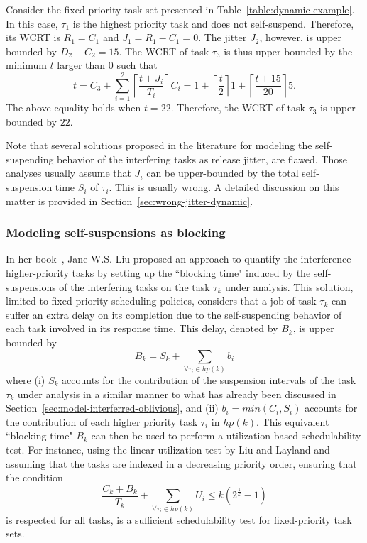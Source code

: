 \begin{example}
\label{ex:suspension-jitter}    
Consider the fixed priority task set presented in Table~\ref{table:dynamic-example}. In this case, $\tau_1$ is the highest priority task and does not self-suspend. Therefore, its WCRT is $R_1 = C_1$ and $J_1 = R_1 - C_1 = 0$. The jitter $J_2$, however, is upper bounded by $D_2 - C_2 =15$. The WCRT of task $\tau_3$ is thus upper bounded by the minimum $t$ larger than $0$ such that 
$$t=C_3+ \sum_{i=1}^2\left\lceil \frac{t + J_i}{T_i} \right\rceil C_i = 1+\left\lceil \frac{t}{2} \right\rceil 1 +\left\lceil \frac{t+15}{20} \right\rceil 5.$$ 
The above equality holds when $t=22$. Therefore, the WCRT of task $\tau_{3}$ is upper bounded by $22$.
\hfill\myendproof  
\end{example}

Note that several solutions proposed in the literature \cite{ECRTS-AudsleyB04,RTAS-AudsleyB04,RTCSA-KimCPKH95} for modeling the 
self-suspending behavior of the interfering tasks as release jitter, are flawed. Those analyses usually assume that $J_i$ can be 
upper-bounded by the total self-suspension time $S_i$ of $\tau_i$. This is usually wrong. A detailed discussion on this matter is 
provided in Section~\ref{sec:wrong-jitter-dynamic}. 

\subsubsection{Modeling self-suspensions as blocking}
\label{sec:model-interfering-blocking}

In her book~\cite[Pages 164-165]{Liu:2000:RS:518501}, Jane W.S. Liu proposed an approach to quantify the interference
higher-priority tasks by setting up the ``blocking time" induced by the self-suspensions of the interfering tasks on the 
task $\tau_k$ under analysis. This solution, limited to fixed-priority scheduling policies, considers that a job of 
task $\tau_k$ can suffer an extra delay on its completion due to the self-suspending behavior of each task involved in its 
response time. This delay, denoted by $B_k$, is upper bounded by 
\begin{equation*}
B_k=S_k+\sum_{\forall \tau_i \in hp(k)} b_i
\end{equation*}
where (i) $S_k$ accounts for the contribution of the suspension intervals of the task $\tau_k$ under analysis in a similar manner to 
what has already been discussed in Section~\ref{sec:model-interferred-oblivious}, and (ii) $b_i=min(C_i, S_i)$ accounts for the contribution of each higher priority task $\tau_i$ in $hp(k)$. This equivalent ``blocking time" $B_k$ can then be used to perform a utilization-based schedulability test. For instance, using the linear utilization test by Liu and Layland \cite{Liu_1973} and assuming that the tasks are indexed in a decreasing priority order, ensuring that the condition
\begin{equation*}
\frac{C_k+B_k}{T_k} + \sum_{\forall \tau_i \in hp(k)} U_i \leq k (2^{\frac{1}{k}}-1)
\end{equation*}
is respected for all tasks, is a sufficient schedulability test for fixed-priority task sets.

